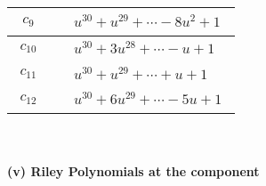 \documentclass[1p]{elsarticle_modified}
\theoremstyle{definition}
\begin{document}
\begin{tabular}{m{50pt}|m{274pt}}
\hline $$\begin{aligned}c_{9}\end{aligned}$$&$\begin{aligned}
&u^{30}+u^{29}+\cdots-8 u^2+1
\end{aligned}$\\
\hline $$\begin{aligned}c_{10}\end{aligned}$$&$\begin{aligned}
&u^{30}+3 u^{28}+\cdots- u+1
\end{aligned}$\\
\hline $$\begin{aligned}c_{11}\end{aligned}$$&$\begin{aligned}
&u^{30}+u^{29}+\cdots+u+1
\end{aligned}$\\
\hline $$\begin{aligned}c_{12}\end{aligned}$$&$\begin{aligned}
&u^{30}+6 u^{29}+\cdots-5 u+1
\end{aligned}$\\
\hline
\end{tabular}\\~\\
\newpage\renewcommand{\arraystretch}{1}
\flushleft \textbf{(v) Riley Polynomials at the component}\newline \\
\end{document}

